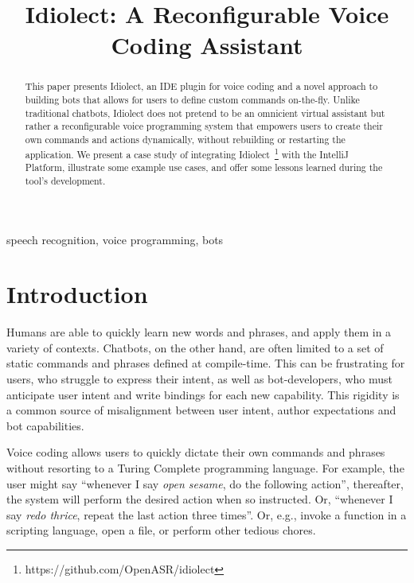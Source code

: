 \documentclass[conference]{IEEEtran}
\begin{document}
\title{Idiolect: A Reconfigurable Voice Coding Assistant}

\author{
\and
{}
\and
{}
}

\maketitle

\begin{abstract}
This paper presents Idiolect, an IDE plugin for voice coding and a novel approach to building bots that allows for users to define custom commands on-the-fly. Unlike traditional chatbots, Idiolect does not pretend to be an omnicient virtual assistant but rather a reconfigurable voice programming system that empowers users to create their own commands and actions dynamically, without rebuilding or restarting the application. We present a case study of integrating Idiolect~\footnote{https://github.com/OpenASR/idiolect} with the IntelliJ Platform, illustrate some example use cases, and offer some lessons learned during the tool's development.
\end{abstract}

\begin{IEEEkeywords}
    speech recognition, voice programming, bots
\end{IEEEkeywords}

\section{Introduction}


Humans are able to quickly learn new words and phrases, and apply them in a variety of contexts. Chatbots, on the other hand, are often limited to a set of static commands and phrases defined at compile-time. This can be frustrating for users, who struggle to express their intent, as well as bot-developers, who must anticipate user intent and write bindings for each new capability. This rigidity is a common source of misalignment between user intent, author expectations and bot capabilities.

Voice coding allows users to quickly dictate their own commands and phrases without resorting to a Turing Complete programming language. For example, the user might say ``whenever I say \textit{open sesame}, do the following action'', thereafter, the system will perform the desired action when so instructed. Or, ``whenever I say \textit{redo thrice}, repeat the last action three times''. Or, e.g., invoke a function in a scripting language, open a file, or perform other tedious chores.
\end{document}
